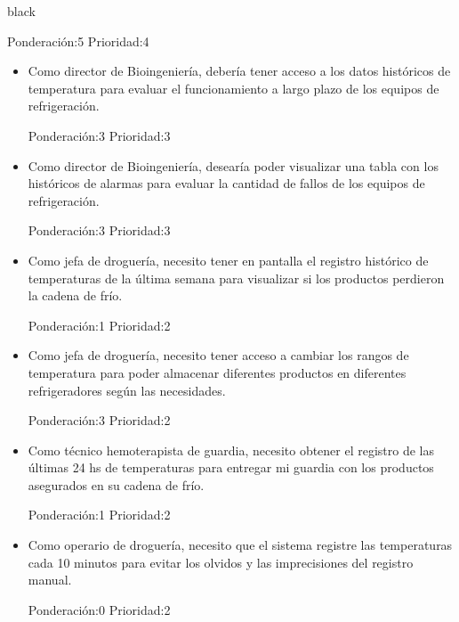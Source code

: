 \documentclass[11pt]{charter}
\begin{document}
\begin{consigna}{black}
\begin{itemize}
Ponderación:5 Prioridad:4
\end{itemize}


\begin{itemize}
\item Como director de Bioingeniería, debería tener acceso a los datos históricos de temperatura para evaluar el funcionamiento a largo plazo de los equipos de refrigeración. 

Ponderación:3 Prioridad:3
\end{itemize}

\begin{itemize}
\item Como director de Bioingeniería, desearía poder visualizar una tabla con los históricos de alarmas para evaluar la cantidad de fallos de los equipos de refrigeración. 

Ponderación:3 Prioridad:3
\end{itemize}


\begin{itemize}
\item Como jefa de droguería, necesito tener en pantalla el registro histórico de temperaturas de la última semana para visualizar si los productos perdieron la cadena de frío. 

Ponderación:1 Prioridad:2
\end{itemize}

\begin{itemize}
\item Como jefa de droguería, necesito tener acceso a cambiar los rangos de temperatura para poder almacenar diferentes productos en diferentes refrigeradores según las necesidades. 

Ponderación:3 Prioridad:2
\end{itemize}

\begin{itemize}
\item Como técnico hemoterapista de guardia, necesito obtener el registro de las últimas 24 hs de temperaturas para entregar mi guardia con los productos asegurados en su cadena de frío. 

Ponderación:1 Prioridad:2
\end{itemize}

\begin{itemize}
\item Como operario de droguería, necesito que el sistema registre las temperaturas cada 10 minutos para evitar los olvidos y las imprecisiones del registro manual. 

Ponderación:0 Prioridad:2
\end{itemize}

\end{consigna}
\end{document}
